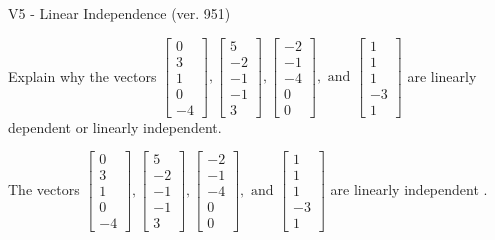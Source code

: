 \begin{exercise}
  \begin{exerciseTitle}V5 - Linear Independence (ver. 951)\end{exerciseTitle}
  \begin{exerciseStatement}
    Explain why the vectors \(\left[\begin{array}{r}
0 \\
3 \\
1 \\
0 \\
-4
\end{array}\right] , \left[\begin{array}{r}
5 \\
-2 \\
-1 \\
-1 \\
3
\end{array}\right] , \left[\begin{array}{r}
-2 \\
-1 \\
-4 \\
0 \\
0
\end{array}\right] , \text{ and } \left[\begin{array}{r}
1 \\
1 \\
1 \\
-3 \\
1
\end{array}\right]\) are linearly dependent or linearly independent.	


  \end{exerciseStatement}
  \begin{exerciseAnswer}
   The vectors \(\left[\begin{array}{r}
0 \\
3 \\
1 \\
0 \\
-4
\end{array}\right] , \left[\begin{array}{r}
5 \\
-2 \\
-1 \\
-1 \\
3
\end{array}\right] , \left[\begin{array}{r}
-2 \\
-1 \\
-4 \\
0 \\
0
\end{array}\right] , \text{ and } \left[\begin{array}{r}
1 \\
1 \\
1 \\
-3 \\
1
\end{array}\right]\) are 
  	 linearly independent  .
  


  \end{exerciseAnswer}
\end{exercise}